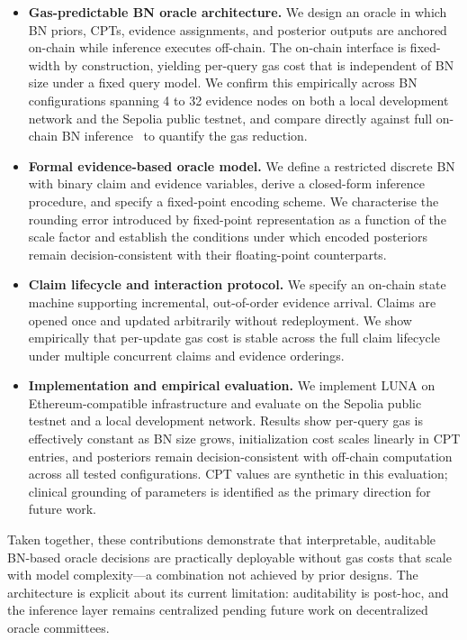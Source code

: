 \documentclass[journal]{IEEEtran}
\begin{document}
\begin{itemize}

  \item \textbf{Gas-predictable BN oracle architecture.}
  We design an oracle in which BN priors, CPTs, evidence
  assignments, and posterior outputs are anchored on-chain
  while inference executes off-chain.
  The on-chain interface is fixed-width by construction,
  yielding per-query gas cost that is independent of BN
  size under a fixed query model.
  We confirm this empirically across BN configurations
  spanning 4 to 32 evidence nodes on both a local
  development network and the Sepolia public testnet,
  and compare directly against full on-chain BN
  inference~\cite{bn-oracle} to quantify the gas
  reduction.

  \item \textbf{Formal evidence-based oracle model.}
  We define a restricted discrete BN with binary claim
  and evidence variables, derive a closed-form inference
  procedure, and specify a fixed-point encoding scheme.
  We characterise the rounding error introduced by
  fixed-point representation as a function of the scale
  factor and establish the conditions under which encoded
  posteriors remain decision-consistent with their
  floating-point counterparts.

  \item \textbf{Claim lifecycle and interaction protocol.}
  We specify an on-chain state machine supporting
  incremental, out-of-order evidence arrival.
  Claims are opened once and updated arbitrarily without
  redeployment.
  We show empirically that per-update gas cost is stable
  across the full claim lifecycle under multiple
  concurrent claims and evidence orderings.

  \item \textbf{Implementation and empirical evaluation.}
  We implement LUNA on Ethereum-compatible infrastructure
  and evaluate on the Sepolia public testnet and a local
  development network.
  Results show per-query gas is effectively constant as
  BN size grows, initialization cost scales linearly in
  CPT entries, and posteriors remain decision-consistent
  with off-chain computation across all tested
  configurations.
  CPT values are synthetic in this evaluation; clinical
  grounding of parameters is identified as the primary
  direction for future work.

\end{itemize}

Taken together, these contributions demonstrate that
interpretable, auditable BN-based oracle decisions are
practically deployable without gas costs that scale with
model complexity---a combination not achieved by prior
designs.
The architecture is explicit about its current
limitation: auditability is post-hoc, and the inference
layer remains centralized pending future work on
decentralized oracle committees.
\end{document}
